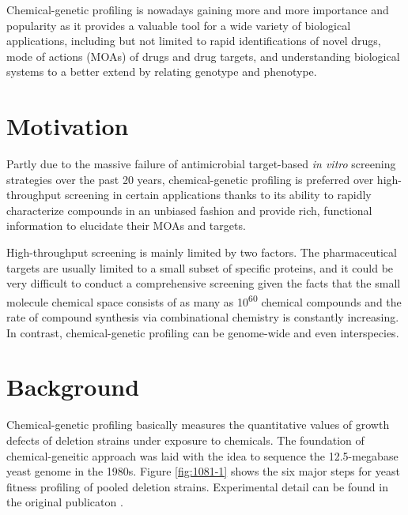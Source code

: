 \documentclass[12pt,conference,compsocconf]{../IEEEtran}
\begin{document}
Chemical-genetic profiling is nowadays gaining more and more importance and popularity as it provides a valuable tool for a wide variety of biological applications, including but not limited to rapid identifications of novel drugs, mode of actions (MOAs) of drugs and drug targets, and understanding biological systems to a better extend by relating genotype and phenotype.

\section{Motivation}

Partly due to the massive failure of antimicrobial target-based \textit{in vitro} screening strategies over the past 20 years, chemical-genetic profiling is preferred over high-throughput screening in certain applications thanks to its ability to rapidly characterize compounds in an unbiased fashion and provide rich, functional information to elucidate their MOAs and targets.

High-throughput screening is mainly limited by two factors. The pharmaceutical targets are usually limited to a small subset of specific proteins, and it could be very difficult to conduct a comprehensive screening given the facts that the small molecule chemical space consists of as many as 10\textsuperscript{60} chemical compounds \citep{1104} and the rate of compound synthesis via combinational chemistry is constantly increasing. In contrast, chemical-genetic profiling can be genome-wide and even interspecies.

\section{Background}

Chemical-genetic profiling basically measures the quantitative values of growth defects of deletion strains under exposure to chemicals. The foundation of chemical-geneitic approach was laid with the idea to sequence the 12.5-megabase yeast genome in the 1980s. Figure \ref{fig:1081-1} shows the six major steps for yeast fitness profiling of pooled deletion strains. Experimental detail can be found in the original publicaton \citep{1081}.
\end{document}
